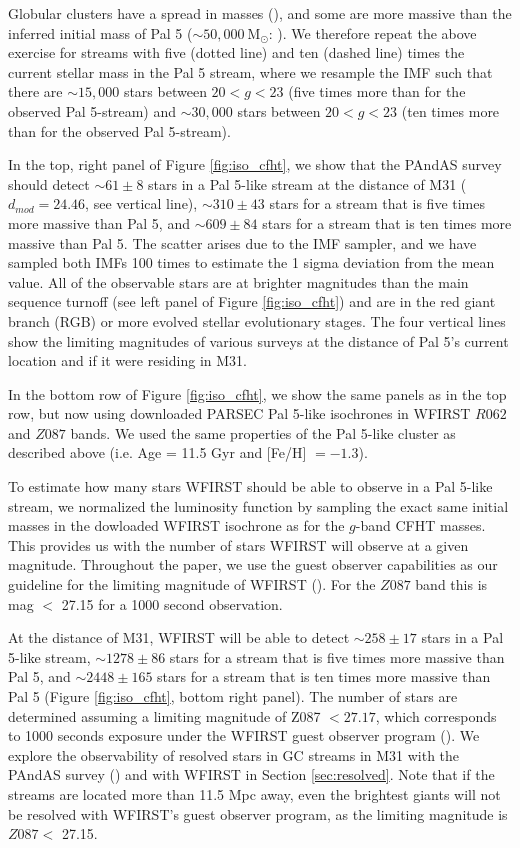 \documentclass[twocolumn]{aastex62}
\newcommand{\msun}{\textrm{M}_\odot}
\begin{document}
Globular clusters have a spread in masses (\citealt{harris96}), and some are more massive than the inferred initial mass of Pal 5 (${\sim} 50,000 ~\msun$: \citealt{ibata17}). We therefore repeat the above exercise for streams with five (dotted line) and ten (dashed line) times the current stellar mass in the Pal 5 stream, where we resample the IMF such that there are   ${\sim}15,000$ stars between $20 < g < 23$  (five times more than for the observed Pal 5-stream) and ${\sim}30,000$  stars between $20 < g < 23$ (ten times more than for the observed Pal 5-stream). 

In the top, right panel of Figure \ref{fig:iso_cfht}, we show that the PAndAS survey should detect ${\sim}61 \pm 8$ stars in a Pal 5-like stream at the distance of M31 ($d_{mod} = 24.46$, see vertical line), ${\sim}310 \pm 43$ stars for a stream that is five times more massive than Pal 5, and ${\sim}609 \pm 84$ stars for a stream that is ten times more massive than Pal 5. The scatter arises due to the IMF sampler, and we have sampled both IMFs 100 times to estimate the 1 sigma deviation from the mean value. All of the observable stars are at brighter magnitudes than the main sequence turnoff (see left panel of Figure \ref{fig:iso_cfht}) and are in the red giant branch (RGB) or more evolved stellar evolutionary stages. The four vertical lines show the limiting magnitudes of various surveys at the distance of Pal 5's current location and if it were residing in M31.

In the bottom row of Figure \ref{fig:iso_cfht}, we show the same panels as in the top row, but now using downloaded PARSEC Pal 5-like isochrones in WFIRST $R062$ and $Z087$ bands. We used the same properties of the Pal 5-like cluster as described above (i.e. Age = 11.5 Gyr and [Fe/H] $= -1.3$). 

To estimate how many stars WFIRST should be able to observe in a Pal 5-like stream, we normalized the luminosity function by sampling the exact same initial masses in the dowloaded WFIRST isochrone as for the $g$-band CFHT masses. This provides us with the number of stars WFIRST will observe at a given magnitude. Throughout the paper, we use the guest observer capabilities as our guideline for the limiting magnitude of WFIRST (\citealt{spergel13}). For the $Z087$ band this is mag $<$ 27.15 for a 1000 second observation.

At the distance of M31, WFIRST will be able to detect ${\sim}258\pm 17$ stars in a Pal 5-like stream,  ${\sim}1278 \pm 86$ stars for a stream that is five times more massive than Pal 5, and ${\sim} 2448 \pm 165$ stars for a stream that is ten times more massive than Pal 5 (Figure \ref{fig:iso_cfht}, bottom right panel). The number of stars are determined assuming a limiting magnitude of Z087 $<27.17$, which corresponds to 1000 seconds exposure under the WFIRST guest observer program (\citealt{spergel13}). 
We explore the observability of resolved stars in GC streams in M31 with the PAndAS survey (\citealt{mcconnachie09}) and with WFIRST in Section \ref{sec:resolved}. Note that if the streams are located more than 11.5 Mpc away, even the brightest giants will not be resolved with WFIRST's guest observer program, as the limiting magnitude is $Z087 <$  27.15.
\end{document}
